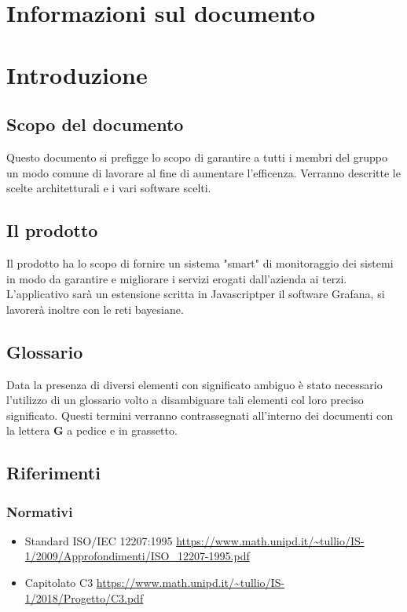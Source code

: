 \section*{Informazioni sul documento}

\section{Introduzione}
    \subsection{Scopo del documento}
    	Questo documento si prefigge lo scopo di garantire a tutti i membri del gruppo un modo comune di lavorare al fine di aumentare l'efficenza\pedice. Verranno descritte le scelte architetturali e i vari software scelti.
    \subsection{Il prodotto}
    	Il prodotto ha lo scopo di fornire un sistema "smart" di monitoraggio dei sistemi in modo da garantire e migliorare i servizi erogati dall'azienda ai terzi. L'applicativo sarà un estensione scritta in Javascript\pedice per il software Grafana\pedice, si lavorerà inoltre con le reti bayesiane\pedice.
    \subsection{Glossario}
    	Data la presenza di diversi elementi con significato ambiguo è stato necessario l'utilizzo di un glossario volto a disambiguare tali elementi col loro preciso significato. Questi termini verranno contrassegnati all'interno dei documenti con la lettera \textbf{G} a pedice e in grassetto.
\subsection{Riferimenti}
    \subsubsection{Normativi}
	    \begin{itemize}
	        \item Standard ISO/IEC 12207:1995 \newline \url{https://www.math.unipd.it/~tullio/IS-1/2009/Approfondimenti/ISO_12207-1995.pdf}
	        \item Capitolato C3 \newline \url{https://www.math.unipd.it/~tullio/IS-1/2018/Progetto/C3.pdf}
	    \end{itemize}
